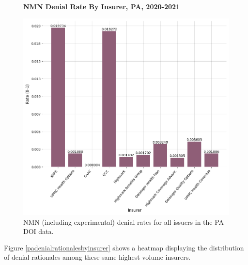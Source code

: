 \documentclass[12pt, a4paper,twoside]{report}
\theoremstyle{plain} %
\theoremstyle{definition} %
\theoremstyle{remark} %
\numberwithin{equation}{chapter}
\begin{document}
		\clearpage
		
		\begin{figure}[h!]
			\centering
			\textbf{NMN Denial Rate By Insurer, PA, 2020-2021}\par\medskip
			\includegraphics[width=\columnwidth]{images/pa_claims/nmn_denial_rate_by_insurer.png}
			\caption{NMN (including experimental) denial rates for all issuers in the PA DOI data.}
			\label{painsurernmndenialrates}
		\end{figure}
		
		
		Figure \ref{padenialrationalesbyinsurer} shows a heatmap displaying the distribution of denial rationales among these same highest volume insurers.
		
\end{document}

